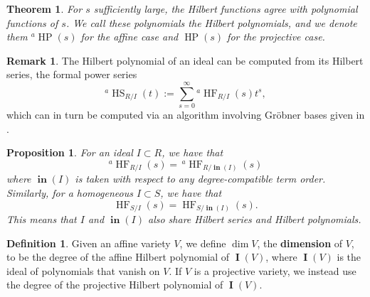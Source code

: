 \documentclass[11pt]{article}
\DeclareMathOperator{\Init}{\mathbf{in}}
\DeclareMathOperator{\HF}{HF}
\DeclareMathOperator{\HP}{HP}
\DeclareMathOperator{\HS}{HS}
\DeclareMathOperator{\I}{\mathbf{I}}
\newtheorem{theorem}{Theorem}
\newtheorem{proposition}{Proposition}
\theoremstyle{definition}
\newtheorem{definition}{Definition}
\newtheorem{remark}{Remark}
\begin{document}
\begin{theorem}
	For $s$ sufficiently large, the Hilbert functions agree with polynomial functions of $s$. We call these polynomials the Hilbert polynomials, and we denote them $^a\HP(s)$ for the affine case and $\HP(s)$ for the projective case.
\end{theorem}


\begin{remark}
	The Hilbert polynomial of an ideal can be computed from its Hilbert series, the formal power series \[ ^a\HS_{R/I}(t) := \sum_{s = 0}^\infty {}^a\HF_{R/I} (s) t^s, \] which can in turn be computed via an algorithm involving Gröbner bases given in \cite{kemper2011course}. 
\end{remark}


\begin{proposition}
	For an ideal $I \subset R$, we have that \[ ^a\HF_{R/I}(s) = \, ^a\HF_{R/\Init(I)}(s) \] where $\Init(I)$ is taken with respect to any degree-compatible term order. Similarly, for a homogeneous $I \subset S$, we have that \[ \HF_{S/I}(s) = \HF_{S/\Init(I)}(s). \] This means that $I$ and $\Init(I)$ also share Hilbert series and Hilbert polynomials. 
\end{proposition}


\begin{definition}
	Given an affine variety $V$, we define $\dim V$, the \textbf{dimension} of $V$, to be the degree of the affine Hilbert polynomial of $\I(V)$, where $\I(V)$ is the ideal of polynomials that vanish on $V$. If $V$ is a projective variety, we instead use the degree of the projective Hilbert polynomial of $\I(V)$. 
\end{definition}
\end{document}
